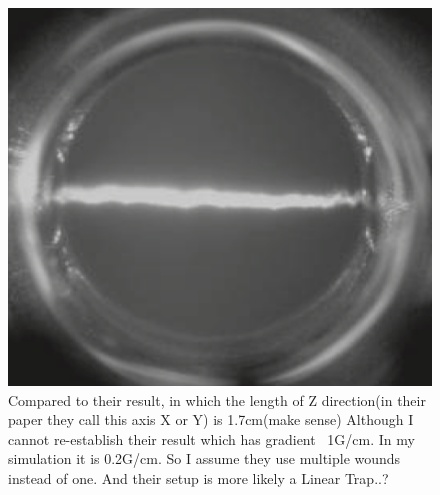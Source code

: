 \documentclass{article}
\begin{document}
\begin{figure}[h]
	\centering
	\includegraphics[scale=0.5]{theirRes}
	\caption{Compared to their result, in which the length of Z direction(in their paper they call this axis X or Y) is 1.7cm(make sense) Although I cannot re-establish their result which has gradient ~1G/cm. In my simulation it is 0.2G/cm. So I assume they use multiple wounds instead of one. And their setup is more likely a Linear Trap..?}
\end{figure}
\end{document}
